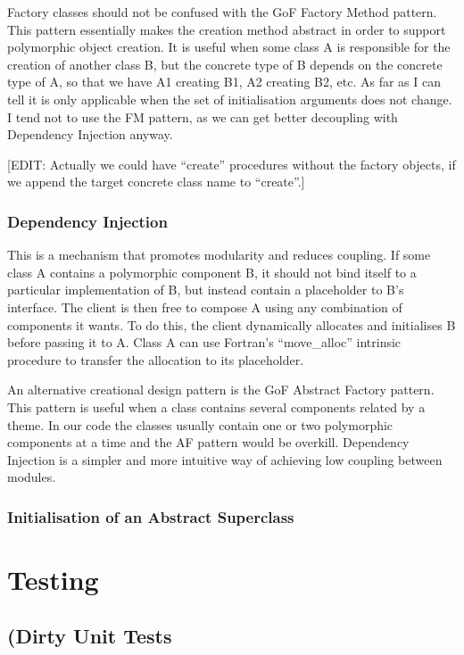 \documentclass[dvips, 11pt, a4paper]{article}
\begin{document}
Factory classes should not be confused with the GoF Factory Method pattern. 
This pattern essentially makes the creation method abstract in order to
 support polymorphic object creation.  It is useful when some class A
is responsible for the creation of another class B, but the concrete type
 of B depends on the concrete type of A, so that we have A1 creating B1,
A2 creating B2, etc.  As far as I can tell it is only applicable when the 
set of initialisation arguments does not change.  I tend not
to use the FM pattern, as we can get better decoupling with Dependency 
Injection anyway.

[EDIT: Actually we could have ``create'' procedures without the factory 
objects, if we append the target concrete class name to ``create''.]

\subsubsection{Dependency Injection}

This is a mechanism that promotes modularity and
reduces coupling.  If some class A contains a polymorphic component B,
it should not bind itself to a particular implementation of B, but
instead contain a placeholder to B's interface.  The client is then
free to compose A using any combination of components it wants.  To do
this, the client dynamically allocates and initialises B before
passing it to A.  Class A can use Fortran's ``move_alloc'' intrinsic
procedure to transfer the allocation to its placeholder.

An alternative creational design pattern is the GoF Abstract Factory
pattern.  This pattern is useful when a class contains several
components related by a theme.  In our code the classes usually
contain one or two polymorphic components at a time and the AF pattern
would be overkill.  Dependency Injection is a simpler and more
intuitive way of achieving low coupling between modules.


\subsubsection{Initialisation of an Abstract Superclass}
\label{sec:InterfaceVsImplementation}


\section{Testing}
\label{sec:Testing}

\subsection{(Dirty Unit Tests}
\label{sec:DirtyUnitTests}
\end{document}
